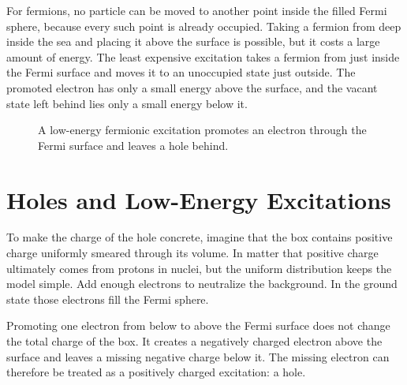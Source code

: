 For fermions, no particle can be moved to another point inside the filled Fermi sphere, because every such point is already occupied. Taking a fermion from deep inside the sea and placing it above the surface is possible, but it costs a large amount of energy. The least expensive excitation takes a fermion from just inside the Fermi surface and moves it to an unoccupied state just outside. The promoted electron has only a small energy above the surface, and the vacant state left behind lies only a small energy below it.

\begin{figure}
\centering
{}
\caption{A low-energy fermionic excitation promotes an electron through the Fermi surface and leaves a hole behind.}
\end{figure}

\section{Holes and Low-Energy Excitations}

To make the charge of the hole concrete, imagine that the box contains positive charge uniformly smeared through its volume. In matter that positive charge ultimately comes from protons in nuclei, but the uniform distribution keeps the model simple. Add enough electrons to neutralize the background. In the ground state those electrons fill the Fermi sphere.

Promoting one electron from below to above the Fermi surface does not change the total charge of the box. It creates a negatively charged electron above the surface and leaves a missing negative charge below it. The missing electron can therefore be treated as a positively charged excitation: a hole.

\begin{classroomqa}
\end{classroomqa}

